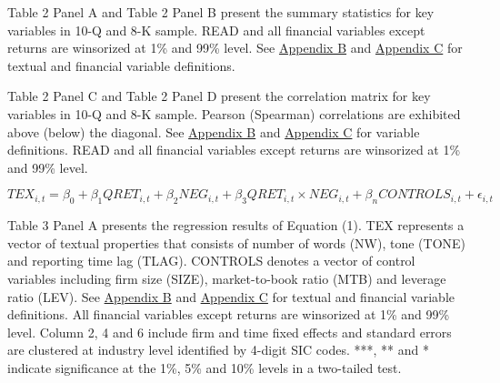 
\newpage



Table 2 Panel A and Table 2 Panel B present the summary statistics for key variables in 10-Q and 8-K sample. READ and all financial variables except returns are winsorized at 1\% and 99\% level. See \hyperref[appb]{Appendix B} and \hyperref[appc]{Appendix C} for textual and financial variable definitions.

\newpage
\begin{landscape}



Table 2 Panel C and Table 2 Panel D present the correlation matrix for key variables in 10-Q and 8-K sample. Pearson (Spearman) correlations are exhibited above (below) the diagonal. See \hyperref[appb]{Appendix B} and \hyperref[appc]{Appendix C} for variable definitions. READ and all financial variables except returns are winsorized at 1\% and 99\% level. 
\end{landscape}

\newpage

\setcounter{equation}{0}
\begin{equation}
TEX_{i,t}=\beta_0+\beta_1QRET_{i,t}+\beta_2NEG_{i,t}+\beta_3QRET_{i,t}\times NEG_{i,t}+\beta_nCONTROLS_{i,t}+\epsilon_{i,t}
\end{equation}

Table 3 Panel A presents the regression results of Equation (1). TEX represents a vector of textual properties that consists of number of words (NW), tone (TONE) and reporting time lag (TLAG). CONTROLS denotes a vector of control variables including firm size (SIZE), market-to-book ratio (MTB) and leverage ratio (LEV). See \hyperref[appb]{Appendix B} and \hyperref[appc]{Appendix C} for textual and financial variable definitions. All financial variables except returns are winsorized at 1\% and 99\% level. Column 2, 4 and 6 include firm and time fixed effects and standard errors are clustered at industry level identified by 4-digit SIC codes. ***, ** and * indicate significance at the 1\%, 5\% and 10\% levels in a two-tailed test.

